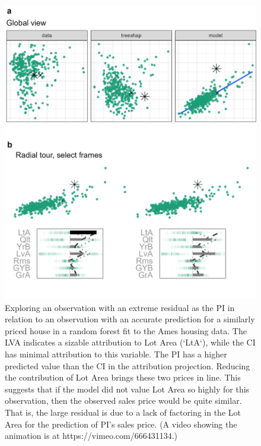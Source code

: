 \documentclass[
]{jss}
\begin{document}
\begin{CodeChunk}
\begin{figure}

{\centering \includegraphics[width=0.9\linewidth]{./figures/case_ames2018} 

}

\caption[Exploring an observation with an extreme residual as the PI in relation to an observation with an accurate prediction for a similarly priced house in a random forest fit to the Ames housing data]{Exploring an observation with an extreme residual as the PI in relation to an observation with an accurate prediction for a similarly priced house in a random forest fit to the Ames housing data. The LVA indicates a sizable attribution to Lot Area (`LtA`), while the CI has minimal attribution to this variable. The PI has a higher predicted value than the CI in the attribution projection. Reducing the contribution of Lot Area brings these two prices in line. This suggests that if the model did not value Lot Area so highly for this observation, then the observed sales price would be quite similar. That is, the large residual is due to a lack of factoring in the Lot Area for the prediction of PI's sales price. (A video showing the animation is at https://vimeo.com/666431134.)}\label{fig:caseames}
\end{figure}
\end{CodeChunk}
\end{document}
